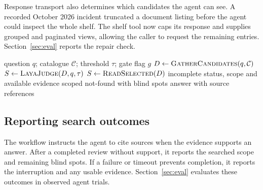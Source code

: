 Response transport also determines which candidates the agent can see.
A recorded October 2026 incident truncated a document listing before the
agent could inspect the whole shelf. The shelf tool now caps its response and
supplies grouped and paginated views, allowing the caller to request the
remaining entries. Section~\ref{sec:eval} reports the repair check.

\begin{algorithm}[tbp]
\caption{Tiered access with optional evidence gate}
\label{alg:tiered}
\begin{algorithmic}[1]
\Require question $q$; catalogue $\mathcal{C}$; threshold $\tau$; gate flag $g$
\State $D \gets \textsc{GatherCandidates}(q,\mathcal{C})$ 
  \State $S \gets \textsc{LayaJudge}(D,q,\tau)$ 
\Else
  \State $S \gets \textsc{ReadSelected}(D)$
\EndIf
{}
  \State \Return incomplete status, scope and available evidence
  \State \Return scoped not-found with blind spots
\Else
  \State \Return answer with source references
\EndIf
\end{algorithmic}
\end{algorithm}

\subsection{Reporting search outcomes}
The workflow instructs the agent to cite sources when the evidence
supports an answer. After a completed review without support, it reports
the searched scope and remaining blind spots. If a failure or timeout
prevents completion, it reports the interruption and any usable evidence.
Section~\ref{sec:eval} evaluates these outcomes in observed agent trials.

